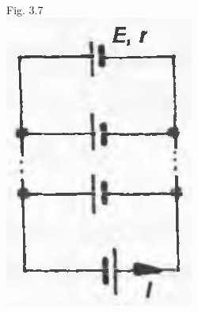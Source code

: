 \documentclass[10pt]{article}
\begin{document}
Fig. 3.7\\
\includegraphics[max width=\textwidth, center]{2025_07_01_5b3ff9fa0d508c8e9f17g-151(1)}
\end{document}

